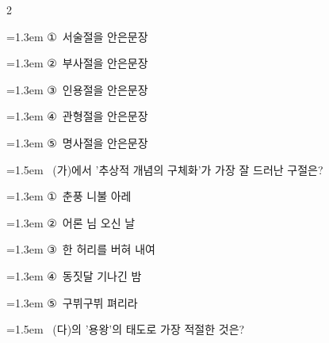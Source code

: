 \documentclass[10pt, a4paper]{article}
\begin{document}
\begin{multicols}{2}
\begin{minipage}{\columnwidth}
\vspace{0.5mm}
{\hangindent=1.3em  \noindent\hspace{0.3em}①~서술절을 안은문장\par}
{\hangindent=1.3em  \noindent\hspace{0.3em}②~부사절을 안은문장\par}
{\hangindent=1.3em  \noindent\hspace{0.3em}③~인용절을 안은문장\par}
{\hangindent=1.3em  \noindent\hspace{0.3em}④~관형절을 안은문장\par}
{\hangindent=1.3em  \noindent\hspace{0.3em}⑤~명사절을 안은문장\par}
\vspace{4mm}
\end{minipage}
\par

\noindent\begin{minipage}{\columnwidth}
\vspace{2mm}
{\hangindent=1.5em  ~(가)에서 '추상적 개념의 구체화'가 가장 잘 드러난 구절은?\par}

\vspace{0.5mm}
{\hangindent=1.3em  \noindent\hspace{0.3em}①~춘풍 니불 아레\par}
{\hangindent=1.3em  \noindent\hspace{0.3em}②~어론 님 오신 날\par}
{\hangindent=1.3em  \noindent\hspace{0.3em}③~한 허리를 버혀 내여\par}
{\hangindent=1.3em  \noindent\hspace{0.3em}④~동짓달 기나긴 밤\par}
{\hangindent=1.3em  \noindent\hspace{0.3em}⑤~구뷔구뷔 펴리라\par}
\vspace{4mm}
\end{minipage}
\par

\noindent\begin{minipage}{\columnwidth}
\vspace{2mm}
{\hangindent=1.5em  ~(다)의 '용왕'의 태도로 가장 적절한 것은?\par}


\end{minipage}
\end{multicols}
\end{document}
